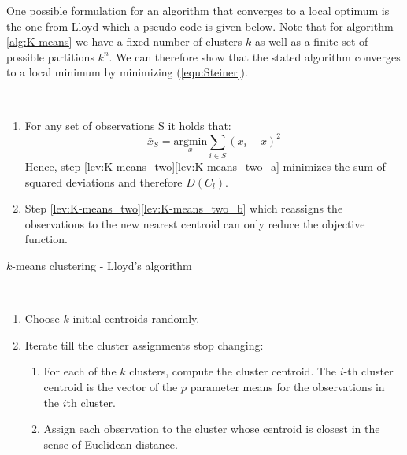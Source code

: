 One possible formulation for an algorithm that converges to a local optimum is the one from Lloyd \cite{lloyd1982least} which a pseudo code is given below. Note that for algorithm \ref{alg:K-means} we have a fixed number of clusters $k$ as well as a finite set of possible partitions $k^n$. We can therefore show that the stated algorithm converges to a local minimum by minimizing (\ref{equ:Steiner}).

\begin{remark}~
	\begin{enumerate}[label=(\roman*)]
		\item For any set of observations S it holds that: 
			\begin{equation*}
				\bar x_S = \underset{x}{\text{argmin}}\sum_{i \in S} (x_i - x)^2
			\end{equation*}
			Hence, step \ref{lev:K-means_two}\ref{lev:K-means_two_a} minimizes the sum of squared deviations and therefore $D(C_l)$.
		\item Step \ref{lev:K-means_two}\ref{lev:K-means_two_b} which reassigns the observations to the new nearest centroid can only reduce the objective function.
	\end{enumerate}
\end{remark}

	
\begin{algorithm}
	\caption{$k$-means clustering \cite{Introducion_Stat_Learning} - Lloyd's algorithm}\label{alg:K-means}
\begin{algorithmic}
\\
	\begin{enumerate}
	\item Choose $k$ initial centroids randomly.
	\item  \label{lev:K-means_two}Iterate till the cluster assignments stop changing:
	\begin{enumerate}[label=\emph{\alph*})]
		\item \label{lev:K-means_two_a} For each of the $k$ clusters, compute the cluster centroid. The $i$-th cluster centroid is the vector of the $p$ parameter means for the observations in the $i$th cluster. 
		\item \label{lev:K-means_two_b}Assign each observation to the cluster whose centroid is closest in the sense of Euclidean distance. 
	\end{enumerate}
	\end{enumerate}
\end{algorithmic}
\end{algorithm}

